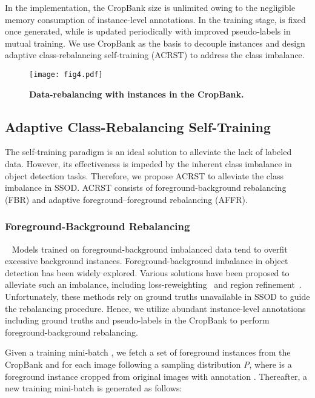 In the implementation, the CropBank size is unlimited owing to the negligible memory consumption of instance-level annotations.  In the training stage,  is fixed once generated, while  is updated periodically with improved pseudo-labels in mutual training. We use CropBank as the basis to decouple instances and design adaptive class-rebalancing self-training (ACRST) to address the class imbalance. 

\begin{figure}[h!]
\texttt{[image: fig4.pdf]}
\caption{\textbf{Data-rebalancing with instances in the CropBank.}}
\label{fig:4}
\end{figure}

\subsection{Adaptive Class-Rebalancing Self-Training}\label{3.4}

The self-training paradigm is an ideal solution to alleviate the lack of labeled data. However, its effectiveness is impeded by the inherent class imbalance in object detection tasks. Therefore, we propose ACRST to alleviate the class imbalance in SSOD. ACRST consists of foreground-background rebalancing (FBR) and adaptive foreground–foreground rebalancing (AFFR).

\subsubsection{Foreground-Background Rebalancing} \label{3.4.1}
\ 
\newline
Models trained on foreground-background imbalanced data tend to overfit excessive background instances. Foreground-background imbalance in object detection has been widely explored.  Various solutions have been proposed to alleviate such an imbalance, including loss-reweighting~\cite{2017Focal} and region refinement~\cite{2017Faster}. Unfortunately, these methods rely on ground truths unavailable in SSOD to guide the rebalancing procedure. Hence, we utilize abundant instance-level annotations including ground truths and pseudo-labels in the CropBank to perform foreground-background rebalancing. 

Given a training mini-batch , we fetch a set of foreground instances  from the CropBank  and  for each image  following a sampling distribution \emph{P}, where  is a foreground instance cropped from original images with annotation . Thereafter, a new training mini-batch   is generated as follows:
    
